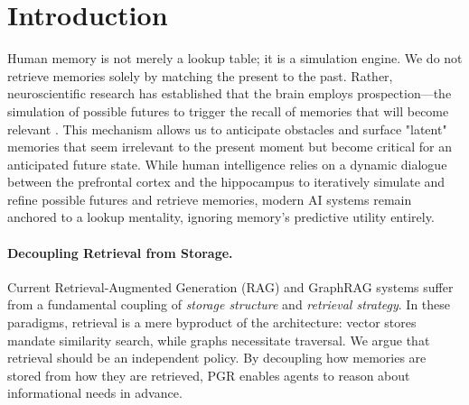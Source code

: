 \section{Introduction}
\label{sec:introduction}


Human memory is not merely a lookup table; it is a simulation engine. We do not retrieve memories solely by matching the present to the past. Rather, neuroscientific research has established that the brain employs prospection—the simulation of possible futures to trigger the recall of memories that will become relevant \cite{schacter2017episodic,addis2007constructive}. This mechanism allows us to anticipate obstacles and surface "latent" memories that seem irrelevant to the present moment but become critical for an anticipated future state. While human intelligence relies on a dynamic dialogue between the prefrontal cortex and the hippocampus to iteratively simulate and refine possible futures and retrieve memories, modern AI systems remain anchored to a lookup mentality, ignoring memory's predictive utility entirely.

\vspace{-0.2cm}
\paragraph{Decoupling Retrieval from Storage.} Current Retrieval-Augmented Generation (RAG) \cite{guu2020retrieval, lewis2020rag} and GraphRAG \cite{edge2024graphrag} systems suffer from a fundamental coupling of \textit{storage structure} and \textit{retrieval strategy}. In these paradigms, retrieval is a mere byproduct of the architecture: vector stores mandate similarity search, while graphs necessitate traversal. We argue that retrieval should be an independent policy. By decoupling how memories are stored from how they are retrieved, PGR enables agents to reason about informational needs in advance.

